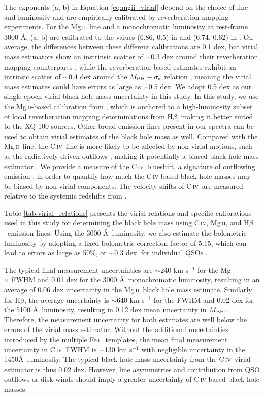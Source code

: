 \documentclass[fleqn,usenatbib]{mnras}
\newcommand{\mgii}{Mg\,\textsc{ii}}
\newcommand{\civ}{C\,\textsc{iv}}
\newcommand{\feii}{Fe\,\textsc{ii}}
\newcommand{\hbeta}{H\textsc{$\beta$}}
\begin{document}
The exponents (a, b) in Equation \ref{eq:mgii_virial} depend on the choice of line and luminosity and are empirically calibrated by reverberation mapping experiments. For the \mgii\ line and a monochromatic luminosity at rest-frame 3000 \AA, (a, b) are calibrated to the values (6.86, 0.5) in \citet{Vestergaard_2009} and (6.74, 0.62) in \citet{Shen_2011}. On average, the differences between these different calibrations are 0.1 dex, but virial mass estimators show an instrinsic scatter of $\sim0.3$ dex around their reverberation mapping counterparts \citep[][]{DallaBonta_2020}, while the reverberation-based estimates exhibit an intrinsic scatter of $\sim0.4$ dex around the $M_{\rm BH}-\sigma_{*}$  relation \citep{Bennert_2021}, meaning the virial mass estimates could have errors as large as $\sim0.5$ dex. We adopt 0.5 dex as our single-epoch virial black hole mass uncertainty in this study. In this study, we use the \mgii-based calibration from \citet{Shen_2011}, which is anchored to a high-luminosity subset of local reverberation mapping determinations from \hbeta, making it better suited to the XQ-100 sources. Other broad emission-lines present in our spectra can be used to obtain virial estimates of the black hole mass as well. Compared with the \mgii\ line, the \civ\ line is more likely to be affected by non-virial motions, such as the radiatively driven outflows \citep[e.g.,][]{Proga_2000, Saturni_2018}, making it potentially a biased black hole mass estimator \citep[e.g.,][]{baskin_laor_2005, Sulentic_2007, Shen_2008}. We provide a measure of the \civ\ blueshift, a signature of outflowing emission \citep{Richards_2011}, in order to quantify how much the \civ-based black hole masses may be biased by non-virial components. The velocity shifts of \civ\ are measured relative to the systemic redshifts from \citet{Lopez_2016_XQ100}.

Table \ref{tab:virial_relations} presents the virial relations and specific calibrations used in this study for determining the black hole mass using \civ, \mgii, and \hbeta\ emission-lines. Using the 3000 \AA\ luminosity, we also estimate the bolometric luminosity by adopting a fixed bolometric correction factor of 5.15, which can lead to errors as large as 50\%, or $\sim$0.3 dex, for individual QSOs \citep{Richards_2006}.

The typical final measurement uncertainties are $\sim$240 km s$^{-1}$ for the \mgii\ FWHM and 0.01 dex for the 3000 \AA\ monochromatic luminosity, resulting in an average of 0.06 dex uncertainty in the \mgii\ black hole mass estimate. Similarly for \hbeta, the average uncertainty is $\sim$640 km s$^{-1}$ for the FWHM and 0.02 dex for the 5100 \AA\ luminosity, resulting in 0.12 dex mean uncertainty in $M_{\rm{BH}}$. Therefore, the measurement uncertainty for both estimates are well below the errors of the virial mass estimator. Without the additional uncertainties introduced by the multiple \feii\ templates, the mean final measurement uncertainty in \civ\ FWHM is $\sim$130 km s$^{-1}$ with negligible uncertainty in the 1450\AA\ luminosity. The typical black hole mass uncertainty from the \civ\ virial estimator is thus 0.02 dex. However, line asymmetries and contribution from QSO outflows or disk winds should imply a greater uncertainty of \civ-based black hole masses.
\end{document}
